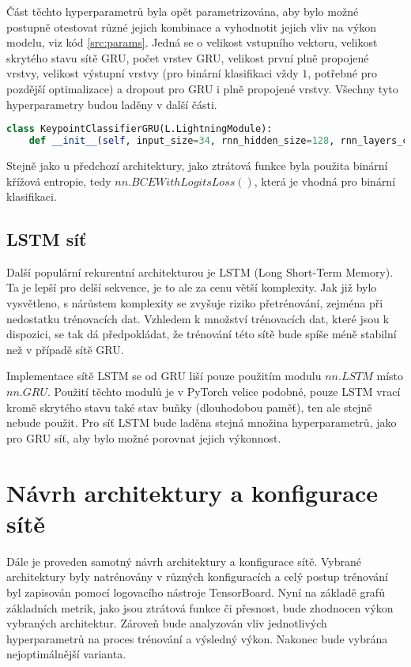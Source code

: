 Část těchto hyperparametrů byla opět parametrizována, aby bylo možné postupně
otestovat různé jejich kombinace a vyhodnotit jejich vliv na výkon modelu, viz
kód \ref{src:params}. Jedná se o velikost vstupního vektoru, velikost skrytého
stavu sítě GRU, počet vrstev GRU, velikost první plně propojené vrstvy,
velikost výstupní vrstvy (pro binární klasifikaci vždy $1$, potřebné pro
pozdější optimalizace) a dropout pro GRU i plně propojené vrstvy. Všechny tyto
hyperparametry budou laděny v další části.

\begin{lstlisting}[language=Python, label=src:params, caption={Parametry konstruktoru třídy $KeypointClassifierGRU$ definující hyperparametry sítě}]
class KeypointClassifierGRU(L.LightningModule):
    def __init__(self, input_size=34, rnn_hidden_size=128, rnn_layers_count=2, fc_size=128, output_size=1, rnn_dropout=0.3, fc_dropout=0.3, device=None):
\end{lstlisting}

Stejně jako u předchozí architektury, jako ztrátová funkce byla použita binární
křížová entropie, tedy $nn.BCEWithLogitsLoss()$, která je vhodná pro binární
klasifikaci.

\subsection{LSTM síť}

Další populární rekurentní architekturou je LSTM (Long Short-Term Memory). Ta
je lepší pro delší sekvence, je to ale za cenu větší komplexity. Jak již bylo
vysvětleno, s nárůstem komplexity se zvyšuje riziko přetrénování, zejména při
nedostatku trénovacích dat. Vzhledem k množství trénovacích dat, které jsou k
dispozici, se tak dá předpokládat, že trénování této sítě bude spíše méně
stabilní než v případě sítě GRU.

Implementace sítě LSTM se od GRU liší pouze použitím modulu $nn.LSTM$ místo
$nn.GRU$. Použití těchto modulů je v PyTorch velice podobné, pouze LSTM vrací
kromě skrytého stavu také stav buňky (dlouhodobou paměť), ten ale stejně nebude
použit. Pro síť LSTM bude laděna stejná množina hyperparametrů, jako pro GRU
síť, aby bylo možné porovnat jejich výkonnost.

\section{Návrh architektury a konfigurace sítě}

Dále je proveden samotný návrh architektury a konfigurace sítě. Vybrané
architektury byly natrénovány v různých konfiguracích a celý postup trénování
byl zapisován pomocí logovacího nástroje TensorBoard. Nyní na základě grafů
základních metrik, jako jsou ztrátová funkce či přesnost, bude zhodnocen výkon
vybraných architektur. Zároveň bude analyzován vliv jednotlivých hyperparametrů
na proces trénování a výsledný výkon. Nakonec bude vybrána nejoptimálnější
varianta.

